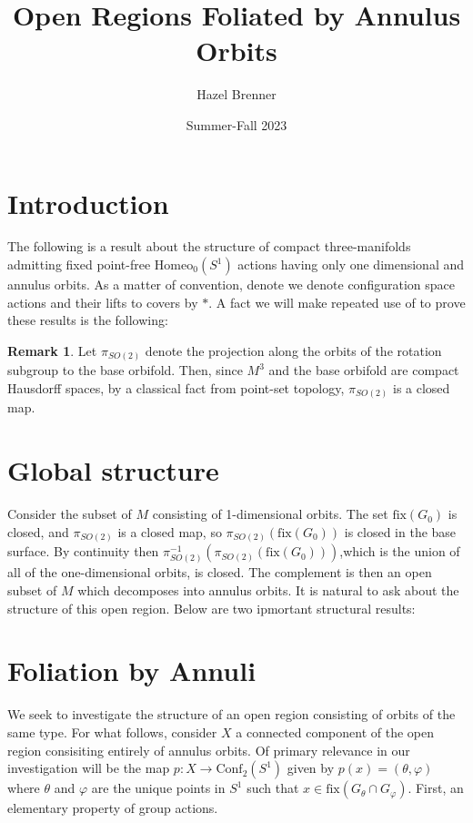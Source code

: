\documentclass[10pt, oneside]{article}
\title{Open Regions Foliated by Annulus Orbits}
\author{Hazel Brenner}
\date{Summer-Fall 2023}
\newcommand{\homeoS}{\text{Homeo}_0(S^1)}
\theoremstyle{definition}
\newtheorem{rem}{Remark}[section]
\theoremstyle{definition}
\begin{document}
\maketitle

\section{Introduction}
The following is a result about the structure of compact three-manifolds admitting fixed point-free $\homeoS$ actions having only one dimensional and annulus orbits. As a matter of convention, denote we denote configuration space actions and their lifts to covers by $*$. A fact we will make repeated use of to prove these results is the following:

\begin{rem}
    Let $\pi_{SO(2)}$ denote the projection along the orbits of the rotation subgroup to the base orbifold. Then, since $M^3$ and the base orbifold are compact Hausdorff spaces, by a classical fact from point-set topology, $\pi_{SO(2)}$ is a closed map.
\end{rem}

\section{Global structure}
Consider the subset of $M$ consisting of 1-dimensional orbits. The set $\text{fix}(G_0)$ is closed, and $\pi_{SO(2)}$ is a closed map, so $\pi_{SO(2)}(\text{fix}(G_0))$ is closed in the base surface. By continuity then $\pi_{SO(2)}^{-1}(\pi_{SO(2)}(\text{fix}(G_0)))$,which is the union of all of the one-dimensional orbits, is closed.
The complement is then an open subset of $M$ which decomposes into annulus orbits. It is natural to ask about the structure of this open region. Below are two ipmortant structural results:

\section{Foliation by Annuli}

We seek to investigate the structure of an open region consisting of orbits of the same type. For what follows, consider $X$ a connected component of the open region consisiting entirely of annulus orbits. Of primary relevance in our investigation will be the map $p: X\to \text{Conf}_2(S^1)$ given by $p(x) = (\theta, \varphi)$ where $\theta$ and $\varphi$ are the unique points in $S^1$ such that $x\in\text{fix}(G_\theta\cap G_\varphi)$. First, an elementary property of group actions.
\end{document}
